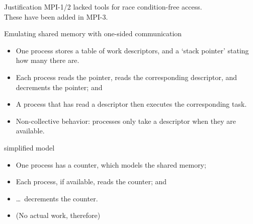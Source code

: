 
\begin{frame}{Justification}
  MPI-1/2 lacked tools for race condition-free access.\\
  These have been added in MPI-3.
\end{frame}

\begin{frame}{Emulating shared memory with one-sided communication}
  \begin{itemize}
  \item One process stores a table of work descriptors, and a `stack pointer'
    stating how many there are.
  \item Each process reads the pointer, reads the corresponding
    descriptor, and decrements the pointer; and
  \item A process that has read a descriptor then executes the
    corresponding task.
  \item Non-collective behavior: processes only take a descriptor when they are available.
  \end{itemize}
\end{frame}

\begin{frame}{simplified model}
  \begin{itemize}
  \item One process has a counter, which models the shared memory;
  \item Each process, if available, reads the counter; and
  \item \ldots~decrements the counter.
  \item (No actual work, therefore)
  \end{itemize}
\end{frame}

